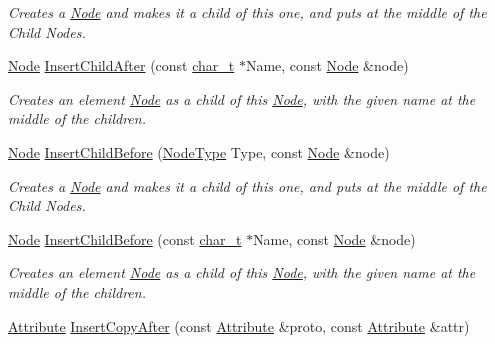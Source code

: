 \begin{DoxyCompactItemize}
\begin{DoxyCompactList}\small\item\em Creates a \hyperlink{classphys_1_1xml_1_1Node}{Node} and makes it a child of this one, and puts at the middle of the Child Nodes. \item\end{DoxyCompactList}\item 
\hyperlink{classphys_1_1xml_1_1Node}{Node} \hyperlink{classphys_1_1xml_1_1Node_a3a2bfe2c267c3ceb96dc4bdae6651a33}{InsertChildAfter} (const \hyperlink{namespacephys_1_1xml_afc87705cd1c2917d87b879715a2d8f6e}{char\_\-t} $\ast$Name, const \hyperlink{classphys_1_1xml_1_1Node}{Node} \&node)
\begin{DoxyCompactList}\small\item\em Creates an element \hyperlink{classphys_1_1xml_1_1Node}{Node} as a child of this \hyperlink{classphys_1_1xml_1_1Node}{Node}, with the given name at the middle of the children. \item\end{DoxyCompactList}\item 
\hyperlink{classphys_1_1xml_1_1Node}{Node} \hyperlink{classphys_1_1xml_1_1Node_a691684896ab5d29a634415e745aaec7a}{InsertChildBefore} (\hyperlink{namespacephys_1_1xml_a668b0cc666a9d49f7c7222a7552115d3}{NodeType} Type, const \hyperlink{classphys_1_1xml_1_1Node}{Node} \&node)
\begin{DoxyCompactList}\small\item\em Creates a \hyperlink{classphys_1_1xml_1_1Node}{Node} and makes it a child of this one, and puts at the middle of the Child Nodes. \item\end{DoxyCompactList}\item 
\hyperlink{classphys_1_1xml_1_1Node}{Node} \hyperlink{classphys_1_1xml_1_1Node_a613bf3df8709b58edaf12caab04796f4}{InsertChildBefore} (const \hyperlink{namespacephys_1_1xml_afc87705cd1c2917d87b879715a2d8f6e}{char\_\-t} $\ast$Name, const \hyperlink{classphys_1_1xml_1_1Node}{Node} \&node)
\begin{DoxyCompactList}\small\item\em Creates an element \hyperlink{classphys_1_1xml_1_1Node}{Node} as a child of this \hyperlink{classphys_1_1xml_1_1Node}{Node}, with the given name at the middle of the children. \item\end{DoxyCompactList}\item 
\hyperlink{classphys_1_1xml_1_1Attribute}{Attribute} \hyperlink{classphys_1_1xml_1_1Node_ae866210535227753bcd02aac8bac9e9e}{InsertCopyAfter} (const \hyperlink{classphys_1_1xml_1_1Attribute}{Attribute} \&proto, const \hyperlink{classphys_1_1xml_1_1Attribute}{Attribute} \&attr)

\end{DoxyCompactItemize}
